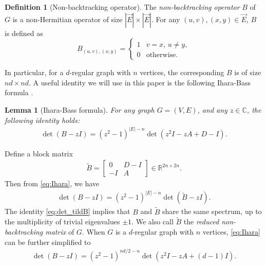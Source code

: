 \documentclass[11pt,reqno]{amsart}
\newtheorem{lemma}[theorem]{Lemma}
\theoremstyle{definition}
\newtheorem{definition}[theorem]{Definition}
\begin{document}
\begin{definition}[Non-backtracking operator]
  The \textit{non-backtracking operator} $B$ of $G$ is a non-Hermitian operator of size $|\vec E| \times |\vec E|$. For any $(u,v), (x,y)\in \vec{E}$, $B$ is defined as $$
B_{(u,v),(x,y)} = \begin{cases}
     1 &\text{$v=x$, $u \neq y$}, \\
     0 &\text{otherwise.}
\end{cases}
$$  
\end{definition}

In particular, for a $d$-regular graph with $n$ vertices, the corresponding $B$ is of size $nd\times nd$.  A useful identity we will use in this paper is the following Ihara-Bass formula \cite{bass_iharaselberg_1992}.
\begin{lemma}[Ihara-Bass formula]\label{lem:Ihara-Bass} For any graph $G=(V,E)$, and any $z\in \mathbb C$, the following identity holds:
    \begin{align}\label{eq:Ihara}
 \det(B-zI)=(z^2-1)^{|E|-n} \det (z^2I -zA+D-I).       
    \end{align}
\end{lemma}
Define a block matrix
\begin{align}\label{eq:tildeB}
    \tilde B=\begin{bmatrix}
0 &  D-I\\
-I  & A
\end{bmatrix} \in \mathbb R^{2n\times 2n}.
\end{align}
Then from \eqref{eq:Ihara}, we have 
\begin{align}\label{eq:det_tildB}
     \det(B-zI)=(z^2-1)^{|E|-n}\det (\tilde B-zI).
\end{align}
The identity \eqref{eq:det_tildB} implies that $B$ and $\tilde B$ share the same spectrum, up to the multiplicity of trivial eigenvalues $\pm 1$. We also call $\tilde B$ the \textit{reduced non-backtracking matrix} of $G$.  When $G$ is a $d$-regular graph with $n$ vertices, \eqref{eq:Ihara} can be further simplified to
 \begin{align}\label{eq:Ihara_regular}
      \det(B-zI)=(z^2-1)^{nd/2-n} \det (z^2I -zA+(d-1) I).       
 \end{align}
\end{document}
